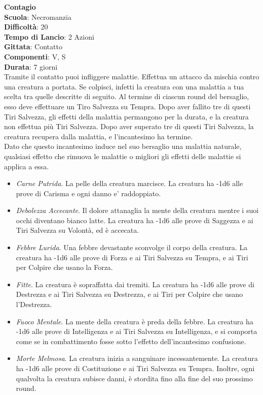 \begin{multicols}{2}
\medskip\textbf{Contagio}\\
\textbf{Scuola}: Necromanzia\\
\textbf{Difficoltà}: 20\\
\textbf{Tempo di Lancio}: 2 Azioni\\
\textbf{Gittata}: Contatto\\
\textbf{Componenti}: V, S\\
\textbf{Durata}: 7 giorni\\
Tramite il contatto puoi infliggere malattie. Effettua un attacco da mischia contro una creatura a portata. Se colpisci, infetti la creatura con una malattia a tua scelta tra quelle descritte di seguito. Al termine di ciascun round del bersaglio, esso deve effettuare un Tiro Salvezza su Tempra. Dopo aver fallito tre di questi Tiri Salvezza, gli effetti della malattia permangono per la durata, e la creatura non effettua più Tiri Salvezza. Dopo aver superato tre di questi Tiri Salvezza, la creatura recupera dalla malattia, e l'incantesimo ha termine. \\
Dato che questo incantesimo induce nel suo bersaglio una malattia naturale, qualsiasi effetto che rimuova le malattie o migliori gli effetti delle malattie si applica a essa.\\
\begin{itemize}
	\item 
	\textit{Carne Putrida}. La pelle della creatura marcisce. La creatura ha -1d6 alle prove di Carisma e ogni danno e' raddoppiato.
\item 
	\textit{Debolezza Accecante}. Il dolore attanaglia la mente della creatura mentre i suoi occhi diventano bianco latte. La creatura ha -1d6 alle prove di Saggezza e ai Tiri Salvezza su Volontà, ed è accecata.
\item 
  \textit{Febbre Lurida}. Una febbre devastante sconvolge il corpo della creatura. La creatura ha -1d6 alle prove di Forza e ai Tiri Salvezza su Tempra, e ai Tiri per Colpire che usano la Forza.
\item 
\textit{Fitte}. La creatura è sopraffatta dai tremiti. La creatura ha -1d6 alle prove di Destrezza e ai Tiri Salvezza su Destrezza, e ai Tiri per Colpire che usano l'Destrezza.
\item 
\textit{Fuoco Mentale}. La mente della creatura è preda della febbre. La creatura ha -1d6 alle prove di Intelligenza e ai Tiri Salvezza su Intelligenza, e si comporta come se in combattimento fosse sotto l'effetto dell'incantesimo confusione.
\item 
\textit{Morte Melmosa}. La creatura inizia a sanguinare incessantemente. La creatura ha -1d6 alle prove di Costituzione e ai Tiri Salvezza su Tempra. Inoltre, ogni qualvolta la creatura subisce danni, è stordita fino alla fine del suo prossimo round.
\end{itemize}


\end{multicols}
